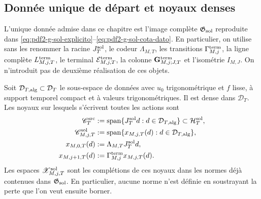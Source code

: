 \subsection{Donnée unique de départ et noyaux denses}

L'unique donnée admise dans ce chapitre est l'image complète
$\mathfrak G_{\rm sol}$ reproduite dans
\eqref{eq:pdf2-g-sol-explicito}--\eqref{eq:pdf2-g-sol-cota-dato}. En particulier,
on utilise sans les renommer la racine $J_T^{\rm sol}$, le codeur
$\Lambda_{M,T}$, les transitions $\Gamma_{M,j}^{\rm term}$, la ligne complète
$L_{M,j,T}^{\rm term}$, le terminal $\mathcal E_{M,j,T}^{\rm term}$, la colonne
$\mathbf G_{M,j;J,T}^{\rm term}$ et l'isométrie $I_{M,J}$. On n'introduit pas de
deuxième réalisation de ces objets.

Soit $\mathcal D_{T,{\rm alg}}\subset\mathcal D_T$ le sous-espace de données avec
$u_0$ trigonométrique et $f$ lisse, à support temporel compact et à valeurs
trigonométriques. Il est dense dans $\mathcal D_T$. Les noyaux sur lesquels
s'écrivent toutes les actions sont
\begin{equation}\label{eq:pdf2-ns-cyclic-cores}
 \begin{aligned}
 \mathscr C_T^{\rm src}
 &:=\operatorname{span}\{J_T^{\rm sol}d:d\in\mathcal D_{T,{\rm alg}}\}
 \subset\mathcal H_T^{\rm sol},\\
 \mathscr C_{M,j,T}^{\rm sol}
 &:=\operatorname{span}\{x_{M,j,T}(d):d\in\mathcal D_{T,{\rm alg}}\},\\
 x_{M,0,T}(d)&:=\Lambda_{M,T}J_T^{\rm sol}d,\\
 x_{M,j+1,T}(d)&:=\Gamma_{M,j}^{\rm term}x_{M,j,T}(d).
 \end{aligned}
\end{equation}
Les espaces $\mathscr X_{M,j,T}^{\rm sol}$ sont les complétions de ces
noyaux dans les normes déjà contenues dans $\mathfrak G_{\rm sol}$. En particulier,
aucune norme n'est définie en soustrayant la perte que l'on veut ensuite borner.


